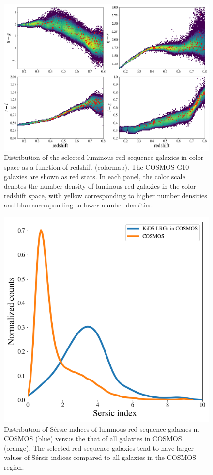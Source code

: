 \documentclass{aa}
\numberwithin{equation}{section}
\begin{document}
\begin{figure}
\includegraphics[width=\textwidth]{figures_tmp/cosmos_color.png}
\caption{Distribution of the selected luminous red-sequence galaxies in color space as a function of redshift (colormap). The COSMOS-G10 galaxies are shown as red stars. In each panel, the color scale denotes the number density of luminous red galaxies in the color-redshift space, with yellow corresponding to higher number densities and blue corresponding to lower number densities.} 
\label{fig:cosmos_color}
\end{figure}

\begin{figure}
\includegraphics[width=\columnwidth]{figures_tmp/cosmos_sersic.png}
\caption{Distribution of S\'{e}rsic indices of luminous red-sequence galaxies in COSMOS (blue) versus the that of all galaxies in COSMOS (orange). The selected red-sequence galaxies tend to have larger values of S\'{e}rsic indices compared to all galaxies in the COSMOS region.}
\label{fig:cosmos_sersic}
\end{figure}
\end{document}
